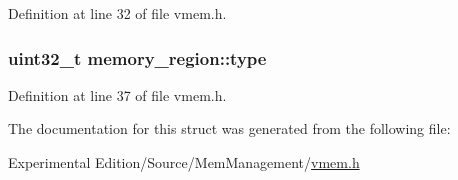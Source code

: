 Definition at line 32 of file vmem.\+h.

\subsubsection[{\texorpdfstring{type}{type}}]{\setlength{\rightskip}{0pt plus 5cm}uint32\+\_\+t memory\+\_\+region\+::type}\hypertarget{structmemory__region_a3591afc4df88a58fa5a91eab6ebe94cc}{}\label{structmemory__region_a3591afc4df88a58fa5a91eab6ebe94cc}


Definition at line 37 of file vmem.\+h.



The documentation for this struct was generated from the following file\+:\begin{DoxyCompactItemize}
\item 
Experimental Edition/\+Source/\+Mem\+Management/\hyperlink{vmem_8h}{vmem.\+h}\end{DoxyCompactItemize}
